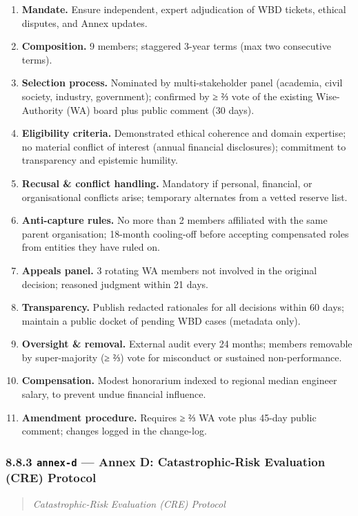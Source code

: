 \documentclass[11pt]{article}
\begin{document}
\begin{enumerate}\setlength\itemsep{0pt}
\item \textbf{Mandate.} Ensure independent, expert adjudication of WBD tickets, ethical disputes, and Annex updates.
\item \textbf{Composition.} 9 members; staggered 3-year terms (max two consecutive terms).
\item \textbf{Selection process.} Nominated by multi-stakeholder panel (academia, civil society, industry, government); confirmed by ≥ ⅔ vote of the existing Wise-Authority (WA) board plus public comment (30 days).
\item \textbf{Eligibility criteria.} Demonstrated ethical coherence and domain expertise; no material conflict of interest (annual financial disclosures); commitment to transparency and epistemic humility.
\item \textbf{Recusal \& conflict handling.} Mandatory if personal, financial, or organisational conflicts arise; temporary alternates from a vetted reserve list.
\item \textbf{Anti-capture rules.} No more than 2 members affiliated with the same parent organisation; 18-month cooling-off before accepting compensated roles from entities they have ruled on.
\item \textbf{Appeals panel.} 3 rotating WA members not involved in the original decision; reasoned judgment within 21 days.
\item \textbf{Transparency.} Publish redacted rationales for all decisions within 60 days; maintain a public docket of pending WBD cases (metadata only).
\item \textbf{Oversight \& removal.} External audit every 24 months; members removable by super-majority (≥ ⅔) vote for misconduct or sustained non-performance.
\item \textbf{Compensation.} Modest honorarium indexed to regional median engineer salary, to prevent undue financial influence.
\item \textbf{Amendment procedure.} Requires ≥ ⅔ WA vote plus 45-day public comment; changes logged in the change-log.
\end{enumerate}


\subsubsection*{8.8.3 \texttt{annex-d} — Annex D: Catastrophic-Risk Evaluation (CRE) Protocol}


\begin{quote}\itshape Catastrophic-Risk Evaluation (CRE) Protocol\end{quote}
\end{document}
